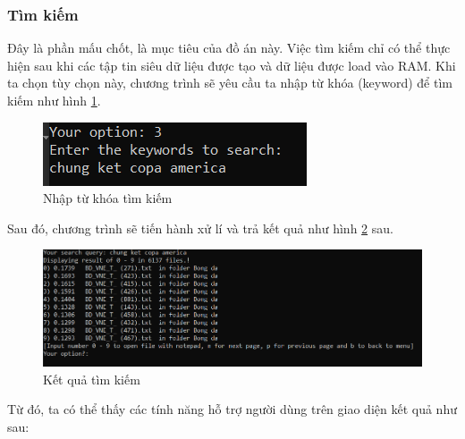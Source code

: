 \documentclass[12pt,a4paper]{article}
\begin{document}
\subsubsection{Tìm kiếm}
Đây là phần mấu chốt, là mục tiêu của đồ án này. Việc tìm kiếm chỉ có thể thực hiện sau khi các tập tin siêu dữ liệu được tạo và dữ liệu được load vào RAM. Khi ta chọn tùy chọn này, chương trình sẽ yêu cầu ta nhập từ khóa (keyword) để tìm kiếm như hình \ref{Fig21}.
\begin{figure}[H]
\begin{center}
\includegraphics[scale=2]{Fig21}
\end{center}
\caption{Nhập từ khóa tìm kiếm}
\label{Fig21}
\end{figure}
Sau đó, chương trình sẽ tiến hành xử lí và trả kết quả như hình \ref{Fig22} sau.
\begin{figure}[H]
\begin{center}
\includegraphics[scale=0.8]{Fig22}
\end{center}
\caption{Kết quả tìm kiếm}
\label{Fig22}
\end{figure}
Từ đó, ta có thể thấy các tính năng hỗ trợ người dùng trên giao diện kết quả như sau:
\end{document}
